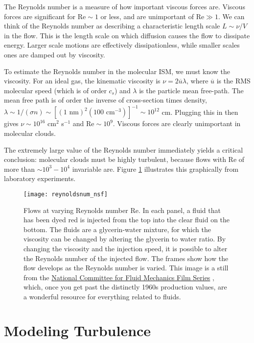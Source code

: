The Reynolds number is a measure of how important viscous forces are. Viscous forces are significant for $\mathrm{Re} \sim 1$ or less, and are unimportant of $\mathrm{Re} \gg 1$. We can think of the Reynolds number as describing a characteristic length scale $L\sim \nu/V$ in the flow. This is the length scale on which diffusion causes the flow to dissipate energy. Larger scale motions are effectively dissipationless, while smaller scales ones are damped out by viscosity.

To estimate the Reynolds number in the molecular ISM, we must know the viscosity. For an ideal gas, the kinematic viscosity is $\nu=2\overline{u}\lambda$, where $\overline{u}$ is the RMS molecular speed (which is of order $c_s$) and $\lambda$ is the particle mean free-path. The mean free path is of order the inverse of cross-section times density, $\lambda \sim 1/(\sigma n) \sim [(1\mbox{ nm})^2 (100\mbox { cm}^{-3})]^{-1}\sim 10^{12}$ cm. Plugging this in then gives 
$\nu \sim 10^{16}$ cm$^2$ s$^{-1}$ and $\mathrm{Re} \sim 10^9$. Viscous forces are clearly unimportant in molecular clouds.

The extremely large value of the Reynolds number immediately yields a critical conclusion: molecular clouds must be highly turbulent, because flows with $\mathrm{Re}$ of more than $\sim 10^3-10^4$ invariable are. Figure \ref{fig:reynoldsnum_nsf} illustrates this graphically from laboratory experiments.

\begin{figure}
\texttt{[image: reynoldsnum\_nsf]}
\caption[Comparison of flows at varying Reynolds numbers]{
\label{fig:reynoldsnum_nsf}
Flows at varying Reynolds number Re. In each panel, a fluid that has been dyed red is injected from the top into the clear fluid on the bottom. The fluids are a glycerin-water mixture, for which the viscosity can be changed by altering the glycerin to water ratio. By changing the viscosity and the injection speed, it is possible to alter the Reynolds number of the injected flow. The frames show how the flow develops as the Reynolds number is varied. This image is a still from the \href{https://www.youtube.com/playlist?list=PL0EC6527BE871ABA3}{National Committee for Fluid Mechanics Film Series}  \citep{taylor64a}, which, once you get past the distinctly 1960s production values, are a wonderful resource for everything related to fluids.
}
\end{figure}

\section{Modeling Turbulence}

